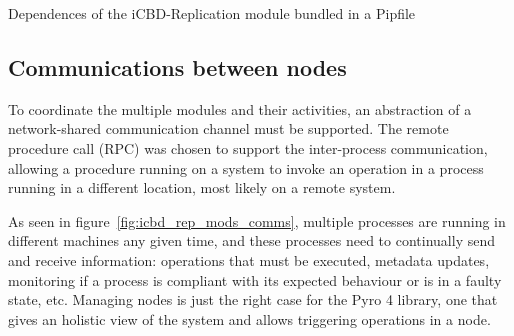 \begin{listing}[ht]
\inputminted{python}{./Chapters/Code/cap4_pip.py}
\caption{Dependences of the iCBD-Replication module bundled in a Pipfile}
\label{listing:impl_icbd_pipfile}
\end{listing}


\subsection{Communications between nodes}
\label{sub:impl_rep_comms}



To coordinate the multiple modules and their activities, an abstraction of a network-shared communication channel must be supported. The remote procedure call (RPC) was chosen to support the inter-process communication, allowing a procedure running on a system to invoke an operation in a process running in a different location, most likely on a remote system.

As seen in figure~\ref{fig:icbd_rep_mods_comms}, multiple processes are running in different machines any given time, and these processes need to continually send and receive information: operations that must be executed, metadata updates, monitoring if a process is compliant with its expected behaviour or is in a faulty state, etc. Managing nodes is just the right case for the Pyro 4 library, one that gives an holistic view of the system and allows triggering operations in a node.


